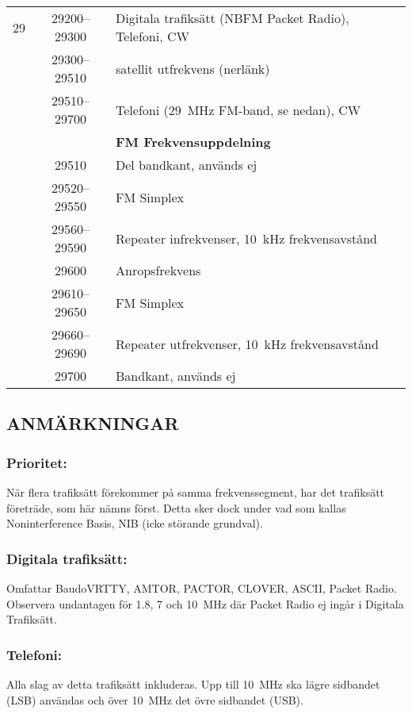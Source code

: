 \begin{longtable}{lcl}
29   & 29200--29300 & Digitala trafiksätt (NBFM Packet Radio), Telefoni, CW \\
     & 29300--29510 & satellit utfrekvens (nerlänk) \\
     & 29510--29700 & Telefoni (29~MHz FM-band, se nedan), CW \\
     &              & \textbf{FM Frekvensuppdelning} \\
     & 29510        & Del bandkant, används ej \\
     & 29520--29550 & FM Simplex \\
     & 29560--29590 & Repeater infrekvenser, 10~kHz frekvensavstånd \\
     & 29600        & Anropsfrekvens \\
     & 29610--29650 & FM Simplex \\
     & 29660--29690 & Repeater utfrekvenser, 10~kHz frekvensavstånd \\
     & 29700        & Bandkant, används ej \\
\end{longtable}

\subsection{ANMÄRKNINGAR}

\subsubsection{Prioritet:}

När flera trafiksätt förekommer på samma frekvenssegment, har det
trafiksätt företräde, som här nämns först. Detta sker dock under
vad som kallas Noninterference Basis, NIB (icke störande grundval).

\subsubsection{Digitala trafiksätt:}

Omfattar BaudoVRTTY, AMTOR, PACTOR, CLOVER, ASCII, Packet Radio.
Observera undantagen för 1.8, 7 och 10~MHz där Packet Radio ej
ingår i Digitala Trafiksätt.

\subsubsection{Telefoni:}

Alla slag av detta trafiksätt inkluderas.
Upp till 10~MHz ska lägre sidbandet (LSB) användas och över 10~MHz det övre
sidbandet (USB).

